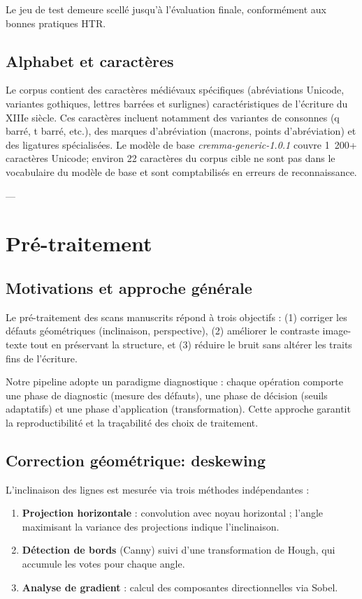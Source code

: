 ﻿\documentclass[twoside,twocolumn,10pt]{article}
\begin{document}
Le jeu de test demeure scellé jusqu'à l'évaluation finale, conformément aux bonnes pratiques HTR.

\subsection{Alphabet et caractères}

Le corpus contient des caractères médiévaux spécifiques (abréviations Unicode, variantes gothiques, lettres barrées et surlignes) caractéristiques de l'écriture du XIIIe siècle. Ces caractères incluent notamment des variantes de consonnes (q barré, t barré, etc.), des marques d'abréviation (macrons, points d'abréviation) et des ligatures spécialisées. Le modèle de base \textit{cremma-generic-1.0.1} couvre 1~200+ caractères Unicode; environ 22 caractères du corpus cible ne sont pas dans le vocabulaire du modèle de base et sont comptabilisés en erreurs de reconnaissance.

---

\section{Pré-traitement}
\fontsize{11}{13}\selectfont
\justifying

\subsection{Motivations et approche générale}

Le pré-traitement des scans manuscrits répond à trois objectifs : (1) corriger les défauts géométriques (inclinaison, perspective), (2) améliorer le contraste image-texte tout en préservant la structure, et (3) réduire le bruit sans altérer les traits fins de l'écriture.

Notre pipeline adopte un paradigme diagnostique : chaque opération comporte une phase de diagnostic (mesure des défauts), une phase de décision (seuils adaptatifs) et une phase d'application (transformation). Cette approche garantit la reproductibilité et la traçabilité des choix de traitement.

\subsection{Correction géométrique: deskewing}

L'inclinaison des lignes est mesurée via trois méthodes indépendantes :

\begin{enumerate}
  \item \textbf{Projection horizontale} : convolution avec noyau horizontal ; l'angle maximisant la variance des projections indique l'inclinaison.
  \item \textbf{Détection de bords} (Canny) suivi d'une transformation de Hough, qui accumule les votes pour chaque angle.
  \item \textbf{Analyse de gradient} : calcul des composantes directionnelles via Sobel.
\end{enumerate}
\end{document}
